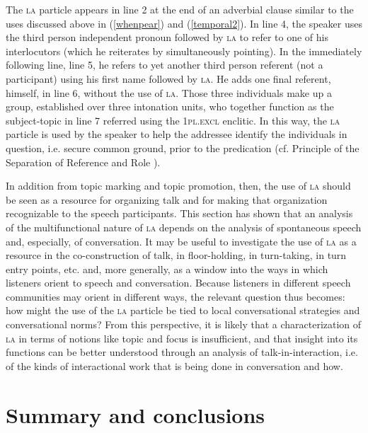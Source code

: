 \z
The \textsc{la} particle appears in line 2 at the end of an adverbial clause similar to the uses discussed above in (\ref{whenpear}) and (\ref{temporal2}). In line 4, the speaker uses the third person independent pronoun followed by \textsc{la} to refer to one of his interlocutors (which he reiterates by simultaneously pointing). In the immediately following line, line 5, he refers to yet another third person referent (not a participant) using his first name followed by \textsc{la}. He adds one final referent, himself, in line 6, without the use of \textsc{la}. Those three individuals make up a group, established over three intonation units, who together function as the subject-topic in line 7 referred using the 1\textsc{pl.excl} enclitic. In this way, the \textsc{la} particle is used by the speaker to help the addressee identify the individuals in question, i.e. secure common ground, prior to the predication (cf. Principle of the Separation of Reference and Role \citep{lambrecht1994}).

In addition from topic marking and topic promotion, then, the use of \textsc{la} should be seen as a resource for organizing talk and for making that organization recognizable to the speech participants. This section has shown that an analysis of the multifunctional nature of \textsc{la} depends on the analysis of spontaneous speech and, especially, of conversation. It may be useful to investigate the use of \textsc{la} as a resource in the co-construction of talk, in floor-holding, in turn-taking, in turn entry points, etc. and, more generally, as a window into the ways in which listeners orient to speech and conversation. Because listeners in different speech communities may orient in different ways, the relevant question thus becomes: how might the use of the \textsc{la} particle be tied to local conversational strategies and conversational norms? From this perspective, it is likely that a characterization of \textsc{la} in terms of notions like topic and focus is insufficient, and that insight into its functions can be better understood through an analysis of talk-in-interaction, i.e. of the kinds of interactional work that is being done in conversation and how.


\section{Summary and conclusions}

%

